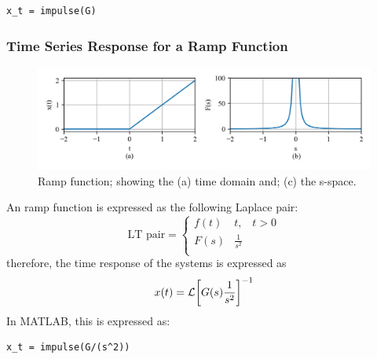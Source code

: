 \documentclass[12pt,letter]{article}
\begin{document}
\lstset{linewidth=5.8in}
\begin{minipage}{1\textwidth}
  \begin{center}
\begin{lstlisting}
x_t = impulse(G)
\end{lstlisting}
  \end{center}
\end{minipage}


\subsubsection{Time Series Response for a Ramp Function}



		\begin{figure}[H]
			\centering
			\includegraphics[width=6.5in]{../figures/T_and_S_space_ramp_function}
			\caption{Ramp function; showing the (a) time domain and; (c) the s-space.}
			\label{fig:T_and_S_space_ramp_function}
		\end{figure}

An ramp function is expressed as the following Laplace pair:
		\begin{equation}
		\text{LT pair} =
			\begin{cases}
			f(t) & t, \; \; \; t>0 \\
			F(s) & \frac{1}{s^2} \\
			\end{cases}
		\end{equation}
therefore, the time response of the systems is expressed as
\begin{equation}
x(t) = \mathcal{L}{\left[G(s) \frac{1}{s^2}\right]}^{-1}
\end{equation}
In MATLAB, this is expressed as:

\lstset{linewidth=5.8in}
\begin{minipage}{1\textwidth}
  \begin{center}
\begin{lstlisting}
x_t = impulse(G/(s^2))
\end{lstlisting}
  \end{center}
\end{minipage}
\end{document}
